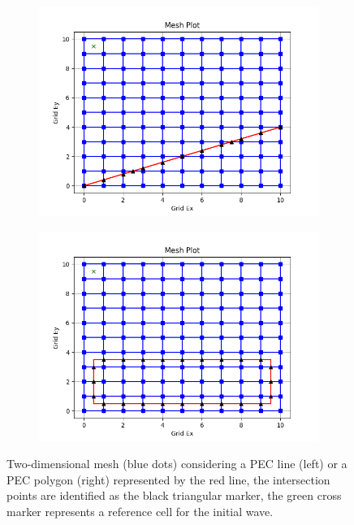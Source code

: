 \documentclass[12pt, oneside]{book}
\begin{document}
\begin{figure}[h!]
    \centering
    \begin{subfigure}[b]{0.49\textwidth}
        \centering
        \includegraphics[width=\textwidth]{Imagenes/CFDTD2D_MeshPECLine.png}
    \end{subfigure}
    \begin{subfigure}[b]{0.49\textwidth}
        \centering
        \includegraphics[width=\textwidth]{Imagenes/CFDTD2D_MeshPECPolygon.png}
    \end{subfigure}
    \caption{Two-dimensional mesh (blue dots) considering a PEC line (left) or a PEC polygon (right) represented by the red line, the intersection points are identified as the black triangular marker, the green cross marker represents a reference cell for the initial wave.}
    \label{fig:CFDTD2D_MeshPEC}
\end{figure}
\end{document}
